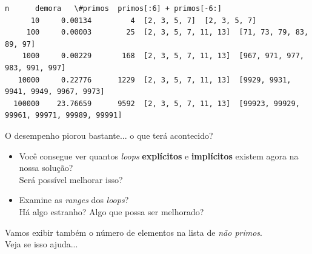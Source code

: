 \documentclass[11pt,a4paper]{article}
\providecommand{\tightlist}{%
      \setlength{\itemsep}{0pt}\setlength{\parskip}{0pt}}
\begin{document}
    \begin{Verbatim}[commandchars=\\\{\}]
       n      demora   \#primos  primos[:6] + primos[-6:]
      10     0.00134         4  [2, 3, 5, 7]  [2, 3, 5, 7]
     100     0.00003        25  [2, 3, 5, 7, 11, 13]  [71, 73, 79, 83, 89, 97]
    1000     0.00229       168  [2, 3, 5, 7, 11, 13]  [967, 971, 977, 983, 991, 997]
   10000     0.22776      1229  [2, 3, 5, 7, 11, 13]  [9929, 9931, 9941, 9949, 9967, 9973]
  100000    23.76659      9592  [2, 3, 5, 7, 11, 13]  [99923, 99929, 99961, 99971, 99989, 99991]

    \end{Verbatim}

    O desempenho piorou bastante... o que terá acontecido?

\begin{itemize}
\tightlist
\item
  Você consegue ver quantos \emph{loops} \textbf{explícitos} e
  \textbf{implícitos} existem agora na nossa solução?\\
  Será possível melhorar isso?
\item
  Examine as \emph{ranges} dos \emph{loops}?\\
  Há algo estranho? Algo que possa ser melhorado?
\end{itemize}

    Vamos exibir também o número de elementos na lista de \emph{não
primos}.\\
Veja se isso ajuda...

\pagebreak
\end{document}
